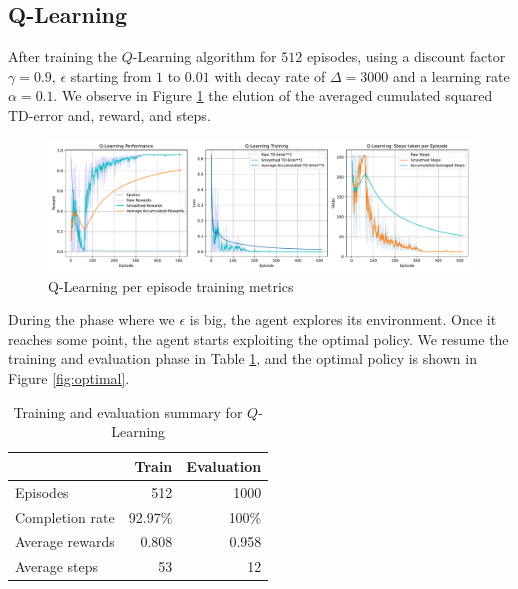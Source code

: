\subsection{Q-Learning}
After training the $Q$-Learning algorithm for $512$ episodes, using a discount factor $\gamma=0.9$, $\epsilon$ starting from $1$ to $0.01$ with decay rate of $\Delta=3000$ and a learning rate $\alpha=0.1$. We observe in Figure \ref{fig:qlog} the elution of the averaged cumulated squared TD-error and, reward, and steps.
\begin{figure}[H]
	\centering
	\includegraphics[width=\linewidth]{figures/QLearning_episode.pdf}
	\caption{Q-Learning per episode training metrics}
	\label{fig:qlog}
\end{figure}
During the phase where we $\epsilon$ is big, the agent explores its environment. Once it reaches some point, the agent starts exploiting the optimal policy. We resume the training and evaluation phase in Table \ref{tab:ql}, and the optimal policy is shown in Figure \ref{fig:optimal}.
\begin{table}
	\centering
	\begin{tabular}{@{}lrr@{}}
		\cmidrule(l){2-3}
		& Train & Evaluation \\ \midrule
		Episodes        &  512      &  1000          \\
		Completion rate &   92.97\%    &  100\%           \\
		Average rewards &   0.808    &    0.958        \\
		Average steps   &    53   &     12       \\ \bottomrule
	\end{tabular}
	\caption{Training and evaluation summary for {$Q$-Learning}}
	\label{tab:ql}
\end{table}

